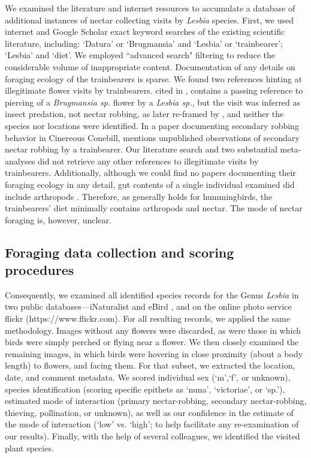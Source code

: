 \documentclass[fleqn,10pt,lineno]{wlpeerj}
\begin{document}
We examined the literature and internet resources to accumulate a database of additional instances of nectar collecting visits by \textit{Lesbia} species. 
First, we used internet and Google Scholar exact keyword searches of the existing scientific literature, including: `Datura' or `Brugmansia' and `Lesbia' or `trainbearer'; `Lesbia' and  `diet'. 
We employed ``advanced search" filtering to reduce the considerable volume of inappropriate content.
Documentation of any details on foraging ecology of the trainbearers is sparse. 
We found two references hinting at illegitimate flower visits by trainbearers. \citet[p.15]{gould1861} cited in \citet{ornelas1994}, contains a passing reference to piercing of a \textit{Brugmansia sp.} flower by a \textit{Lesbia sp.}, but the visit was inferred as insect predation, not nectar robbing, as later re-framed by \citet{ornelas1994}, and neither the species nor locations were identified. 
In a paper documenting secondary robbing behavior in Cinereous Conebill, \citet{vogt2006} mentions unpublished observations of secondary nectar robbing by a trainbearer. %
Our literature search and two substantial meta-analyses \citep{ornelas1994,irwin2010} did not retrieve any other references to illegitimate visits by trainbearers. 
Additionally, although we could find no papers documenting their foraging ecology in any detail, gut contents of a single individual examined did include arthropods \citep{remsen1986}. 
Therefore, as generally holds for hummingbirds, the trainbearers' diet minimally contains arthropods and nectar. 
The mode of nectar foraging is, however, unclear. 

\subsection*{Foraging data collection and scoring procedures}

Consequently, we examined all identified species records for the Genus \textit{Lesbia} in two public databases---iNaturalist \citep{inaturalist} and eBird \citep{ebird}, and on the online photo service flickr (https://www.flickr.com). 
For all resulting records, we applied the same methodology. 
Images without any flowers were discarded, as were those in which birds were simply perched or flying near a flower.
We then closely examined the remaining images, in which birds were hovering in close proximity (about a body length) to flowers, and facing them. 
For that subset, we extracted the location, date, and comment metadata. 
We scored individual sex (`m',`f', or unknown), species identification (scoring specific epithets as `nuna', `victoriae', or `sp.'), estimated mode of interaction (primary nectar-robbing, secondary nectar-robbing, thieving, pollination, or unknown), as well as our confidence in the estimate of the mode of interaction (`low' vs. `high'; to help facilitate any re-examination of our results). 
Finally, with the help of several colleagues, we identified the visited plant species. 
\end{document}
